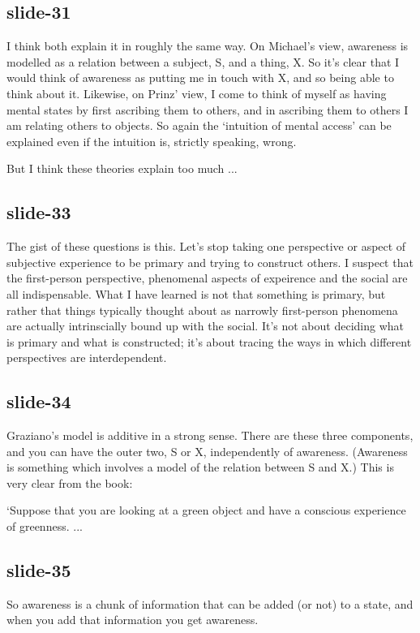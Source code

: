 \documentclass[14pt,\papersize]{extarticle}
\begin{document}
\subsection{slide-31}
I think both explain it in roughly the same way.
On Michael's view, awareness is modelled as a relation between a subject, S,
and a thing, X.
So it's clear that I would think of awareness as putting me in touch
with X, and so being able to think about it.
Likewise, on Prinz’ view, I come to think of myself as having mental states
by first ascribing them to others, and in ascribing them to others I am
relating others to objects.
So again the ‘intuition of mental access’ can be explained even if 
the intuition is, strictly speaking, wrong.
 
But I think these theories explain too much ...
 
\subsection{slide-33}
The gist of these questions is this.
Let’s stop taking one perspective or aspect of subjective experience 
to be primary and trying to construct others. 
I suspect that the first-person perspective, phenomenal aspects of 
expeirence and the social are all indispensable.
What I have learned is not that something is primary, but rather
that things typically thought about as narrowly first-person phenomena are
actually intrinscially bound up with the social.
It's not about deciding what is primary and what is constructed;
it's about tracing the ways in which different perspectives are interdependent.
 
\subsection{slide-34}
Graziano’s model is additive in a strong sense.
There are these three components, and you can have the 
outer two, S or X, independently of awareness.
(Awareness is something which involves a model of 
the relation between S and X.)
This is very clear from the book:
 
‘Suppose that you are looking at a green object and have a conscious 
experience of greenness. ...
 
\subsection{slide-35}
So awareness is a chunk of information that can be added (or not)
to a state, and when you add that information you get awareness.
 
\end{document}

